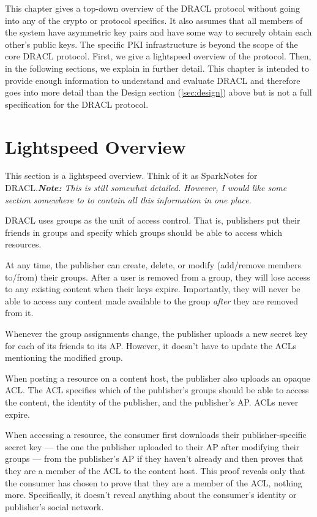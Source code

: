 \documentclass[pdftex,12pt,a4papaer]{report}
\newcommand{\note}[1]{\textit{\textbf{Note:} #1}}
\begin{document}
This chapter gives a top-down overview of the DRACL protocol without going into
any of the crypto or protocol specifics. It also assumes that all members of the
system have asymmetric key pairs and have some way to securely obtain each
other's public keys. The specific PKI infrastructure is beyond the scope of the
core DRACL protocol. First, we give a lightspeed overview of the protocol. Then,
in the following sections, we explain in further detail. This chapter is
intended to provide enough information to understand and evaluate DRACL and
therefore goes into more detail than the Design section (\ref{sec:design}) above
but is not a full specification for the DRACL protocol.

\section{Lightspeed Overview}

This section is a lightspeed overview. Think of it as SparkNotes\texttrademark{}
for DRACL.\note{This is still somewhat detailed. However, I would like some
  section somewhere to to contain all this information in one place.}

DRACL uses groups as the unit of access control. That is, publishers put their
friends in groups and specify which groups should be able to access which
resources.

At any time, the publisher can create, delete, or modify (add/remove members
to/from) their groups. After a user is removed from a group, they will lose
access to any existing content when their keys expire. Importantly, they will
never be able to access any content made available to the group \emph{after}
they are removed from it.
  
Whenever the group assignments change, the publisher uploads a new secret key
for each of its friends to its AP. However, it doesn't have to update the ACLs
mentioning the modified group.
  
When posting a resource on a content host, the publisher also uploads an opaque
ACL. The ACL specifies which of the publisher's groups should be able to access
the content, the identity of the publisher, and the publisher's AP. ACLs never
expire.
  
When accessing a resource, the consumer first downloads their publisher-specific
secret key --- the one the publisher uploaded to their AP after modifying their
groups --- from the publisher's AP if they haven't already and then proves that
they are a member of the ACL to the content host. This proof reveals only that
the consumer has chosen to prove that they are a member of the ACL, nothing
more. Specifically, it doesn't reveal anything about the consumer's identity or
publisher's social network.
  
\end{document}
